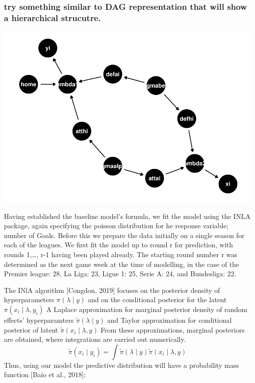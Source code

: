\documentclass[
]{article}
\begin{document}
\hypertarget{try-something-similar-to-dag-representation-that-will-show-a-hierarchical-strucutre.}{%
\subsubsection{try something similar to DAG representation that will
show a hierarchical
strucutre.}\label{try-something-similar-to-dag-representation-that-will-show-a-hierarchical-strucutre.}}

\includegraphics{DissertationWriteUpV1_files/figure-latex/DAG-1.pdf}

Having established the baseline model's formula, we fit the model using
the INLA package, again specifying the poisson distribution for he
response variable; number of Goals. Before this we prepare the data
initially on a single season for each of the leagues. We first fit the
model up to round r for prediction, with rounds 1,\ldots, r-1 having
been played already. The starting round number r was determined as the
next game week at the time of modelling, in the case of the Premier
league: 28, La Liga: 23, Ligue 1: 25, Serie A: 24, and Bundesliga: 22.

The INlA algorithm {[}Congdon, 2019{]} focuses on the posterior density
of hyperparameters \(\pi( \lambda \mid y)\) and on the conditional
posterior for the latent \(\pi(x_i \mid \lambda , y_i)\) A Laplace
approximation for marginal posterior density of random effects'
hyperparamters \(\tilde{\pi}(\lambda \mid y)\) and Taylor approximation
for conditional posterior of latent
\(\tilde{\pi}(x_i \mid \lambda , y)\) From these approximations,
marginal posteriors are obtained, where integrations are carried out
numerically.
\[\tilde{\pi}(x_i \mid y_i) = \int \tilde{\pi}(\lambda \mid y)  \tilde{\pi}(x_i \mid \lambda , y)\]
Thus, using our model the predictive distribution will have a
probability mass function {[}Baio et al., 2018{]}:
\end{document}
